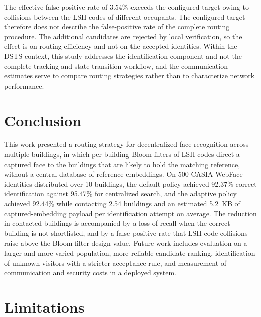 \documentclass[pdflatex,sn-mathphys-num]{sn-jnl}%
\theoremstyle{thmstyleone}%
\theoremstyle{thmstyletwo}%
\theoremstyle{thmstylethree}%
\begin{document}
The effective false-positive rate of 3.54\% exceeds the configured target owing to collisions between the LSH codes of different occupants. The configured target therefore does not describe the false-positive rate of the complete routing procedure. The additional candidates are rejected by local verification, so the effect is on routing efficiency and not on the accepted identities. Within the DSTS context, this study addresses the identification component and not the complete tracking and state-transition workflow, and the communication estimates serve to compare routing strategies rather than to characterize network performance.


\section{Conclusion}
\label{sec:conclusion}

This work presented a routing strategy for decentralized face recognition across multiple buildings, in which per-building Bloom filters of LSH codes direct a captured face to the buildings that are likely to hold the matching reference, without a central database of reference embeddings. On 500 CASIA-WebFace identities distributed over 10 buildings, the default policy achieved 92.37\% correct identification against 95.47\% for centralized search, and the adaptive policy achieved 92.44\% while contacting 2.54 buildings and an estimated 5.2~KB of captured-embedding payload per identification attempt on average. The reduction in contacted buildings is accompanied by a loss of recall when the correct building is not shortlisted, and by a false-positive rate that LSH code collisions raise above the Bloom-filter design value. Future work includes evaluation on a larger and more varied population, more reliable candidate ranking, identification of unknown visitors with a stricter acceptance rule, and measurement of communication and security costs in a deployed system.


\section{Limitations}
\label{sec:limitations}
\end{document}

